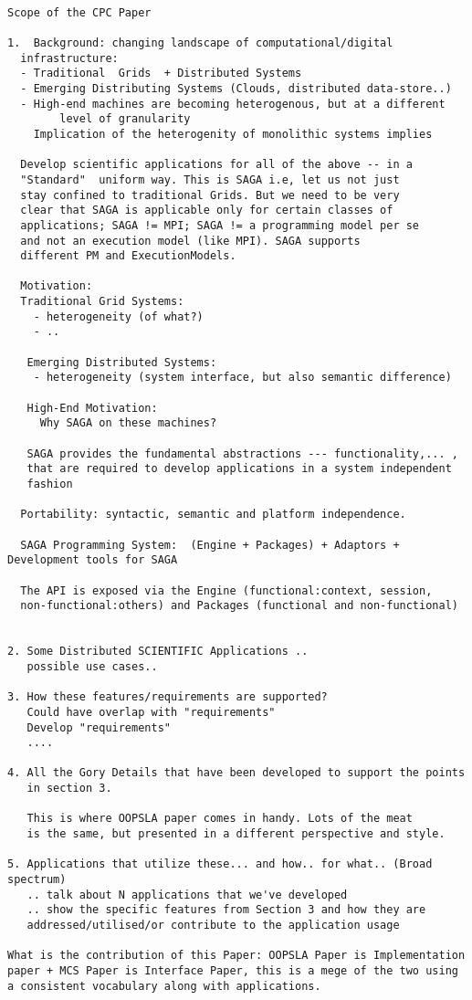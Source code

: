 \documentclass[10pt,letterpaper]{article}
\begin{document}
\begin{verbatim}

Scope of the CPC Paper

1.  Background: changing landscape of computational/digital
  infrastructure:
  - Traditional  Grids	+ Distributed Systems
  - Emerging Distributing Systems (Clouds, distributed data-store..)
  - High-end machines are becoming heterogenous, but at a different
        level of granularity
    Implication of the heterogenity of monolithic systems implies

  Develop scientific applications for all of the above -- in a
  "Standard"  uniform way. This is SAGA i.e, let us not just
  stay confined to traditional Grids. But we need to be very 
  clear that SAGA is applicable only for certain classes of 
  applications; SAGA != MPI; SAGA != a programming model per se
  and not an execution model (like MPI). SAGA supports
  different PM and ExecutionModels.

  Motivation: 
  Traditional Grid Systems:
    - heterogeneity (of what?)
    - .. 
  
   Emerging Distributed Systems:
    - heterogeneity (system interface, but also semantic difference)

   High-End Motivation:
     Why SAGA on these machines?

   SAGA provides the fundamental abstractions --- functionality,... ,
   that are required to develop applications in a system independent
   fashion
 
  Portability: syntactic, semantic and platform independence.

  SAGA Programming System:  (Engine + Packages) + Adaptors + Development tools for SAGA

  The API is exposed via the Engine (functional:context, session,
  non-functional:others) and Packages (functional and non-functional)


2. Some Distributed SCIENTIFIC Applications .. 
   possible use cases..

3. How these features/requirements are supported?
   Could have overlap with "requirements" 
   Develop "requirements"
   ....

4. All the Gory Details that have been developed to support the points
   in section 3.

   This is where OOPSLA paper comes in handy. Lots of the meat 
   is the same, but presented in a different perspective and style.

5. Applications that utilize these... and how.. for what.. (Broad spectrum)
   .. talk about N applications that we've developed
   .. show the specific features from Section 3 and how they are
   addressed/utilised/or contribute to the application usage
  
What is the contribution of this Paper: OOPSLA Paper is Implementation
paper + MCS Paper is Interface Paper, this is a mege of the two using
a consistent vocabulary along with applications.

\end{verbatim}
\end{document}
